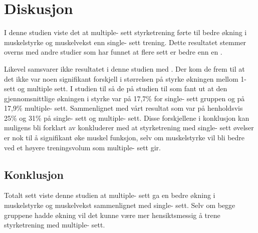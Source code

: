 \documentclass[
]{book}
\begin{document}
\hypertarget{diskusjon}{%
\section{Diskusjon}\label{diskusjon}}

I denne studien viste det at multiple- sett styrketrening førte til bedre økning i muskelstyrke og muskelvekst enn single- sett trening. Dette resultatet stemmer overns med andre studier som har funnet at flere sett er bedre enn en \citep{galvão2005e, humburg2007c}.

Likevel samsvarer ikke resultatet i denne studien med \citep{carpinelli1998d}. Der kom de frem til at det ikke var noen signifikant forskjell i størrelsen på styrke økningen mellom 1- sett og multiple sett. I studien til \citep{carpinelli1998b} så de på studien til \citep{reid1987a} som fant ut at den gjennomsnittlige økningen i styrke var på 17,7\% for single- sett gruppen og på 17,9\% multiple- sett. Sammenlignet med vårt resultat som var på henholdsvis 25\% og 31\% på single- sett og multiple- sett. Disse forskjellene i konklusjon kan muligens bli forklart av \citep{galvão2005d} konkluderer med at styrketrening med single- sett øvelser er nok til å signifikant øke muskel funksjon, selv om muskelstyrke vil bli bedre ved et høyere treningsvolum som multiple- sett gir.

\hypertarget{konklusjon}{%
\subsection{Konklusjon}\label{konklusjon}}

Totalt sett viste denne studien at multiple- sett ga en bedre økning i muskelstyrke og muskelvekst sammenlignet med single- sett. Selv om begge gruppene hadde økning vil det kunne være mer hensiktsmessig å trene styrketrening med multiple- sett.

  
\end{document}
